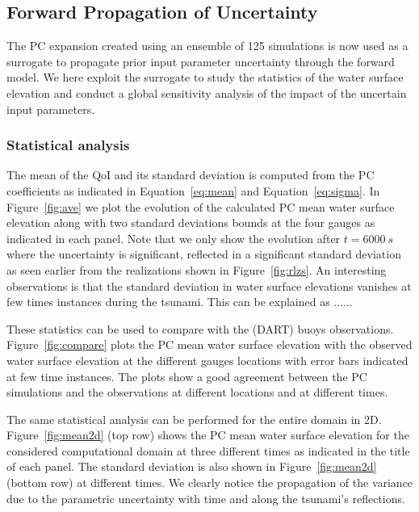 \subsection{Forward Propagation of Uncertainty}
\label{sec:forward}
The PC expansion created using an ensemble of 125 \geoclaw simulations
is now used as a surrogate to propagate prior input parameter uncertainty 
through the forward model. We here exploit the surrogate 
to study the statistics of the water surface elevation and conduct 
a global sensitivity analysis of the impact of the uncertain input parameters.

\subsubsection{Statistical analysis}
The mean of the QoI and its standard deviation is computed
from the PC coefficients as indicated in Equation~\eqref{eq:mean} and Equation~\eqref{eq:sigma}. 
In Figure~\ref{fig:ave} we plot the evolution of
the calculated PC mean water surface elevation along with two standard deviations
bounds at the four gauges as indicated in each panel.  
Note that we only show the evolution after $t=6000~s$ where the uncertainty is significant,
reflected in a significant standard deviation as seen earlier from the realizations shown 
in Figure~\ref{fig:rlzs}. An interesting observations is that the
standard deviation in water surface elevations vanishes at few times instances
during the tsunami. \alert{This can be explained as ...... }

These statistics can be used to compare with the 
(DART) buoys observations. Figure~\ref{fig:compare} 
plots the PC mean water surface elevation with the observed 
water surface elevation at the different gauges locations
with error bars indicated at few time instances. 
The plots show a good agreement between the PC simulations and the 
observations at different locations and at different times. 

The same statistical analysis can be performed for the
entire domain in 2D. Figure~\ref{fig:mean2d} (top row) shows
the PC mean water surface elevation for the considered computational
domain at three different times as indicated in the title of each panel.
The standard deviation is also shown in Figure~\ref{fig:mean2d} (bottom row)
at different times. We clearly notice the propagation of the variance
due to the parametric uncertainty with time
and along the tsunami's reflections. 

        
